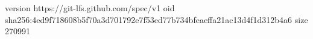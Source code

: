 version https://git-lfs.github.com/spec/v1
oid sha256:4ed9f718608b5f70a3d701792e7f53ed77b734bfeaeffa21ac13d4f1d312b4a6
size 270991
